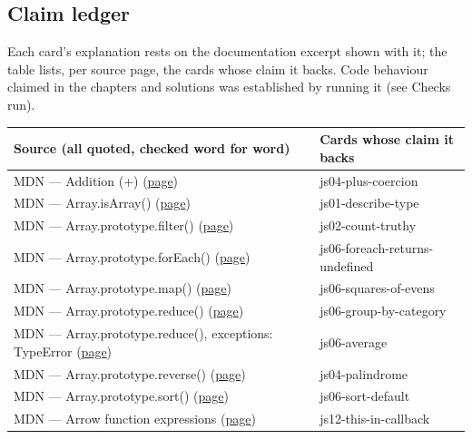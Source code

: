 \documentclass[10pt]{article}
\begin{document}
\subsection*{Claim ledger}
{\footnotesize Each card's explanation rests on the documentation excerpt shown with it; the table lists, per source page, the cards whose claim it backs. Code behaviour claimed in the chapters and solutions was established by running it (see Checks run).}
{\footnotesize\begin{tabularx}{\linewidth}{@{}p{2.2in}X@{}}\toprule
\textbf{Source (all quoted, checked word for word)} & \textbf{Cards whose claim it backs}\\\midrule
MDN — Addition (+) (\href{https://developer.mozilla.org/en-US/docs/Web/JavaScript/Reference/Operators/Addition}{page}) & js04-plus-coercion\\
MDN — Array.isArray() (\href{https://developer.mozilla.org/en-US/docs/Web/JavaScript/Reference/Global_Objects/Array/isArray}{page}) & js01-describe-type\\
MDN — Array.prototype.filter() (\href{https://developer.mozilla.org/en-US/docs/Web/JavaScript/Reference/Global_Objects/Array/filter}{page}) & js02-count-truthy\\
MDN — Array.prototype.forEach() (\href{https://developer.mozilla.org/en-US/docs/Web/JavaScript/Reference/Global_Objects/Array/forEach}{page}) & js06-foreach-returns-undefined\\
MDN — Array.prototype.map() (\href{https://developer.mozilla.org/en-US/docs/Web/JavaScript/Reference/Global_Objects/Array/map}{page}) & js06-squares-of-evens\\
MDN — Array.prototype.reduce() (\href{https://developer.mozilla.org/en-US/docs/Web/JavaScript/Reference/Global_Objects/Array/reduce}{page}) & js06-group-by-category\\
MDN — Array.prototype.reduce(), exceptions: TypeError (\href{https://developer.mozilla.org/en-US/docs/Web/JavaScript/Reference/Global_Objects/Array/reduce}{page}) & js06-average\\
MDN — Array.prototype.reverse() (\href{https://developer.mozilla.org/en-US/docs/Web/JavaScript/Reference/Global_Objects/Array/reverse}{page}) & js04-palindrome\\
MDN — Array.prototype.sort() (\href{https://developer.mozilla.org/en-US/docs/Web/JavaScript/Reference/Global_Objects/Array/sort}{page}) & js06-sort-default\\
MDN — Arrow function expressions (\href{https://developer.mozilla.org/en-US/docs/Web/JavaScript/Reference/Functions/Arrow_functions}{page}) & js12-this-in-callback\\

\end{tabularx}}
\end{document}
